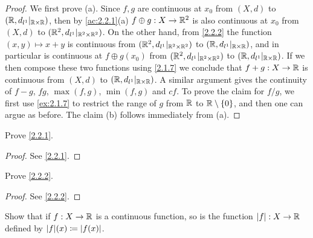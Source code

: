 \begin{proof}
  We first prove (a). Since \(f, g\) are continuous at \(x_0\) from \((X, d)\) to \((\mathbb{R}, d_{l^1}|_{\mathbb{R} \times \mathbb{R}})\), then by \cref{ac:2.2.1}(a) \(f \oplus g : X \to \mathbb{R}^2\) is also continuous at \(x_0\) from \((X, d)\) to \((\mathbb{R}^2, d_{l^1}|_{\mathbb{R}^2 \times \mathbb{R}^2})\).
  On the other hand, from \cref{2.2.2} the function \((x, y) \mapsto x + y\) is continuous from \((\mathbb{R}^2, d_{l^1}|_{\mathbb{R}^2 \times \mathbb{R}^2})\) to \((\mathbb{R}, d_{l^1}|_{\mathbb{R} \times \mathbb{R}})\), and in particular is continuous at \(f \oplus g(x_0)\) from \((\mathbb{R}^2, d_{l^1}|_{\mathbb{R}^2 \times \mathbb{R}^2})\) to \((\mathbb{R}, d_{l^1}|_{\mathbb{R} \times \mathbb{R}})\).
  If we then compose these two functions using \cref{2.1.7} we conclude that \(f + g : X \to \mathbb{R}\) is continuous from \((X, d)\) to \((\mathbb{R}, d_{l^1}|_{\mathbb{R} \times \mathbb{R}})\).
  A similar argument gives the continuity of \(f - g\), \(fg\), \(\max(f, g)\), \(\min(f, g)\) and \(cf\).
  To prove the claim for \(f / g\), we first use \cref{ex:2.1.7} to restrict the range of \(g\) from \(\mathbb{R}\) to \(\mathbb{R} \setminus \left\lbrace0\right\rbrace\), and then one can argue as before.
  The claim (b) follows immediately from (a).
\end{proof}

\exercisesection

\begin{ex}\label{ex:2.2.1}
  Prove \cref{2.2.1}.
\end{ex}

\begin{proof}
  See \cref{2.2.1}.
\end{proof}

\begin{ex}\label{ex:2.2.2}
  Prove \cref{2.2.2}.
\end{ex}

\begin{proof}
  See \cref{2.2.2}.
\end{proof}

\begin{ex}\label{ex:2.2.3}
  Show that if \(f : X \to \mathbb{R}\) is a continuous function, so is the function \(\left\lvert f\right\rvert : X \to \mathbb{R}\) defined by \(\abs{f}(x) \coloneqq \abs{f(x)}\).
\end{ex}

